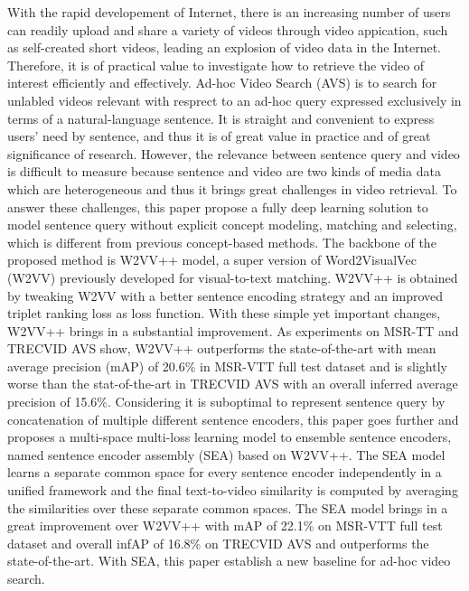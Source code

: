 \begin{abstracten}
    With the rapid developement of Internet, there is an increasing number of users can readily upload and share a variety of videos through video appication, such as self-created short videos, leading an explosion of video data in the Internet. Therefore, it is of practical value to investigate how to retrieve the video of interest efficiently and effectively. Ad-hoc Video Search (AVS) is to search for unlabled videos relevant with resprect to an ad-hoc query expressed exclusively in terms of a natural-language sentence. It is straight and convenient to express users' need by sentence, and thus it is of great value in practice and of great significance of research. However, the relevance between sentence query and video is difficult to measure because sentence and video are two kinds of media data which are heterogeneous and thus it brings great challenges in video retrieval. To answer these challenges, this paper propose a fully deep learning solution to model sentence query without explicit concept modeling, matching and selecting, which is different from previous concept-based methods. The backbone of the proposed method is W2VV++ model, a super version of Word2VisualVec (W2VV) previously developed for visual-to-text matching. W2VV++ is obtained by tweaking W2VV with a better sentence encoding strategy and an improved triplet ranking loss as loss function. With these simple yet important changes, W2VV++ brings in a substantial improvement. As experiments on MSR-TT and TRECVID AVS show, W2VV++ outperforms the state-of-the-art with mean average precision (mAP) of 20.6\% in MSR-VTT full test dataset and is slightly worse than the stat-of-the-art in TRECVID AVS with an overall inferred average precision of 15.6\%. Considering it is suboptimal to represent sentence query by concatenation of multiple different sentence encoders, this paper goes further and proposes a multi-space multi-loss learning model to ensemble sentence encoders, named sentence encoder assembly (SEA) based on W2VV++. The SEA model learns a separate common space for every sentence encoder independently in a unified framework and the final text-to-video similarity is computed by averaging the similarities over these separate common spaces. The SEA model brings in a great improvement over W2VV++ with mAP of 22.1\% on MSR-VTT full test dataset and overall infAP of 16.8\% on TRECVID AVS and outperforms the state-of-the-art. With SEA, this paper establish a new baseline for ad-hoc video search.

\end{abstracten}
